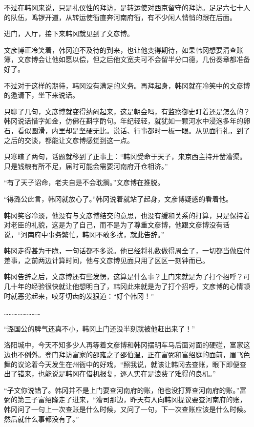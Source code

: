 不过在韩冈来说，只是礼仪性的拜访，是转运使对西京留守的拜访。足足六七十人的队伍，鸣锣开道，从转运使衙直奔河南府衙，有不少闲人悄悄的跟在后面。

进门，入厅，接下来韩冈就见到了文彦博。

文彦博正冷笑着，韩冈迫不及待的到来，也让他变得期待，如果韩冈想要清查账簿，文彦博会让他如愿以偿，但之后他文宽夫可不会留半分口德，几份奏章都准备好了。

不过对于这样的期待，韩冈没有满足的义务。再拜起身，韩冈就在冷笑中的文彦博的邀请下，坐下来说话。

只聊了几句，文彦博就变得纳闷起来，这是朝会吗，有监察御史盯着还是怎么的？韩冈说话惜字如金，仿佛在斟字酌句。年纪轻轻，就犹如一颗河水中浸泡多年的卵石，看似圆滑，内里却是坚硬无比。说话、行事都时一板一眼。从见面行礼，到了之后的交谈，都能让文彦博感觉到这一点。

只寒暄了两句，话题就移到了正事上：“韩冈受命于天子，来京西主持开凿漕渠。只是钱粮有所不足，届时可能会需要河南府开仓相济。”

“有了天子诏命，老夫自是不会耽搁。”文彦博在推脱。

“得潞公此言，韩冈就放心了。”韩冈说着就站了起身，文彦博疑惑的看着他。

韩冈笑容冷淡，他没有与文彦博结交的意思，也没有缓和关系的打算，只是保持着对老臣的礼貌，这是为了自己，而不是为了尊重文彦博，他跟文彦博没有话说，“河南府中事务繁忙，韩冈不敢多扰，就此告辞。”

韩冈走得甚为干脆，一句话都不多说。他已经将礼数做得周全了，一切都当做应付差事，之前两边计算时间，他与文彦博见面只用了区区一刻钟而已。

韩冈告辞之后，文彦博还有些发愣，这算是什么事？上门来就是为了打个招呼？可几十年的经验很快就让他想明白了，韩冈此来就是为了打个招呼，文彦博的心情顿时就恶劣起来，咬牙切齿的发狠道：“好个韩冈！”

……………………

“潞国公的脾气还真不小，韩冈上门还没半刻就被他赶出来了！”

洛阳城中，今天不知多少人再等着文彦博和韩冈摆明车马后面对面的硬碰，富家这边也不例外。登门拜访富家的邵雍之子邵伯温，正在富弼和富绍庭的面前，眉飞色舞的议论着今天发生在州衙中的好戏，“照我说，就该让韩冈去查账，眼下即便查出了错来，也能说是韩冈在借机报复，逐人实在是浪费了难得的良机。”

“子文你说错了。韩冈并不是上门要查河南府的账，他也没打算查河南府的账。”富弼的第三子富绍隆走了进来，“漕司那边，昨天有人向韩冈提议要查河南府的账，韩冈问了一句上一次查账是什么时候，又问了一句，下一次查账应该是什么时候。然后就什么事都没有了。”

